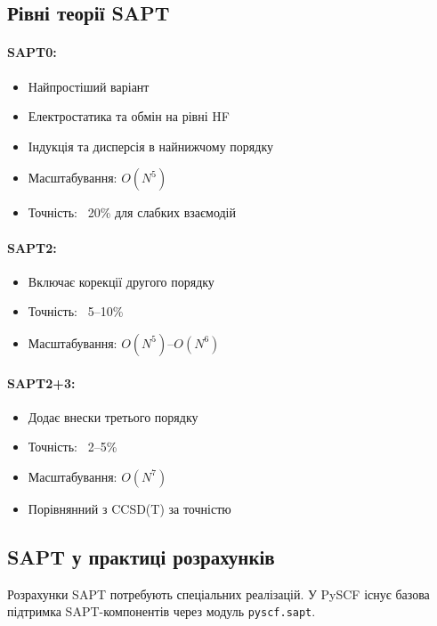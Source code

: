 \subsection{Рівні теорії SAPT}

\paragraph{SAPT0:}
\begin{itemize}
    \item Найпростіший варіант
    \item Електростатика та обмін на рівні HF
    \item Індукція та дисперсія в найнижчому порядку
    \item Масштабування: \(O(N^5)\)
    \item Точність: ~20\% для слабких взаємодій
\end{itemize}

\paragraph{SAPT2:}
\begin{itemize}
    \item Включає корекції другого порядку
    \item Точність: ~5--10\%
    \item Масштабування: \(O(N^5)\)--\(O(N^6)\)
\end{itemize}

\paragraph{SAPT2+3:}
\begin{itemize}
    \item Додає внески третього порядку
    \item Точність: ~2--5\%
    \item Масштабування: \(O(N^7)\)
    \item Порівнянний з CCSD(T) за точністю
\end{itemize}

\subsection{SAPT у практиці розрахунків}

Розрахунки SAPT потребують спеціальних реалізацій. У PySCF існує базова підтримка SAPT-компонентів через модуль \texttt{pyscf.sapt}.

